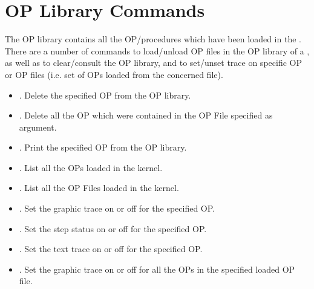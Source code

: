 \section{\CPK{} OP Library Commands}

The OP library contains all the OP/procedures which have been loaded in the
\CPK{}. There are a number of commands to load/unload OP files in the OP
library of a \CPK{}, as well as to clear/consult the OP library, and to
set/unset trace on specific OP or OP files (i.e. set of OPs loaded from the
concerned file).

\begin{itemize}

\item {}. Delete the specified OP from the OP
library. 

\item {}. Delete all the OP which
were contained in the OP File specified as argument.

\item {}. Print the specified OP from the OP
library.

\item {}. List all the OPs loaded in the kernel.

\item {}. List all the OP Files loaded in the kernel.

\item {}. Set the graphic
trace on or off for the specified OP.

\item {}. Set the step
status on or off for the specified OP.

\item {}. Set the text trace
on or off for the specified OP.

\item {}. Set the
graphic trace on or off for all the OPs in the specified loaded OP file.


\end{itemize}
